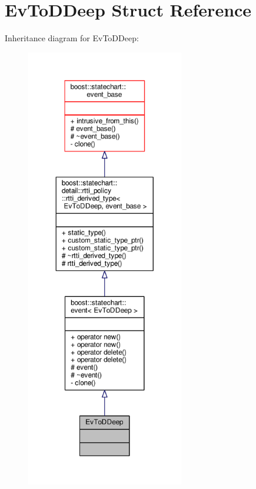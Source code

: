 \hypertarget{struct_ev_to_d_deep}{}\section{Ev\+To\+D\+Deep Struct Reference}
\label{struct_ev_to_d_deep}


Inheritance diagram for Ev\+To\+D\+Deep\+:
\nopagebreak
\begin{figure}[H]
\begin{center}
\leavevmode
\includegraphics[height=550pt]{struct_ev_to_d_deep__inherit__graph}
\end{center}
\end{figure}


